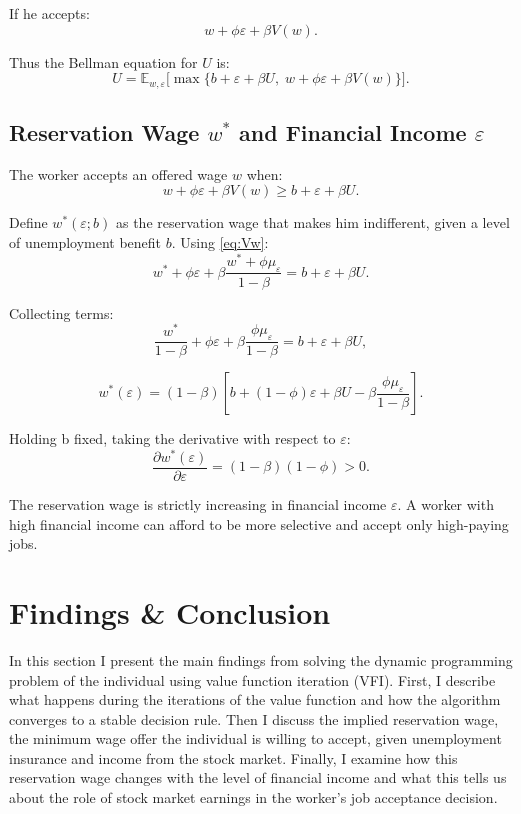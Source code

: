 \documentclass{article}
\begin{document}
	If he accepts:
	\[
	w + \phi\varepsilon + \beta V(w).
	\]
	
	Thus the Bellman equation for $U$ is:
	\begin{equation}
		\label{eq:U_bellman}
		U = \mathbb{E}_{w,\varepsilon}\Big[
		\max\big\{
		b + \varepsilon + \beta U,\;
		w + \phi\varepsilon + \beta V(w)
		\big\}
		\Big].
	\end{equation}
	
	\subsection*{Reservation Wage $w^*$ and Financial Income $\varepsilon$}
	
	The worker accepts an offered wage $w$ when:
	\[
	w + \phi\varepsilon + \beta V(w)
	\ge
	b + \varepsilon + \beta U.
	\]
	
	Define $w^*(\varepsilon; b)$ as the reservation wage that makes him indifferent,
	given a level of unemployment benefit $b$.   
	Using \eqref{eq:Vw}:
	\[
	w^* + \phi\varepsilon + \beta\frac{w^* + \phi\mu_\varepsilon}{1-\beta}
	= b + \varepsilon + \beta U.
	\]
	
	Collecting terms:
	\[
	\frac{w^*}{1-\beta} + \phi\varepsilon + \beta\frac{\phi\mu_\varepsilon}{1-\beta}
	= b + \varepsilon + \beta U,
	\]
	
	\[
	w^*(\varepsilon)
	= (1-\beta)\left[
	b + (1-\phi)\varepsilon + \beta U - \beta\frac{\phi\mu_\varepsilon}{1-\beta}
	\right].
	\]
	
	Holding b fixed, taking the derivative with respect to $\varepsilon$:
	\[
	\frac{\partial w^*(\varepsilon)}{\partial \varepsilon}
	= (1-\beta)(1-\phi) > 0.
	\]
	
	The reservation wage is strictly increasing in financial income $\varepsilon$.  
	A worker with high financial income can afford to be more selective and accept only high-paying jobs.
	
		
	
	\section*{Findings \& Conclusion}
	
	In this section I present the main findings from solving the dynamic programming problem of the individual using value function iteration (VFI). First, I describe what happens during the iterations of the value function and how the algorithm converges to a stable decision rule. Then I discuss the implied reservation wage, the minimum wage offer the individual is willing to accept, given unemployment insurance and income from the stock market. Finally, I examine how this reservation wage changes with the level of financial income and what this tells us about the role of stock market earnings in the worker’s job acceptance decision.\\
	
\end{document}
